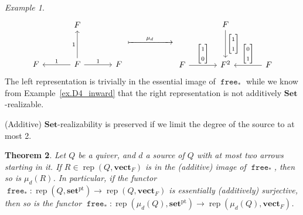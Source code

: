 \documentclass[a4paper]{amsart}
\theoremstyle{plain}
\newtheorem{theorem}{Theorem}[section]
\theoremstyle{definition}
\theoremstyle{remark}
\newtheorem{example}[theorem]{Example}
\newcommand{\funct}[1]{\operatorname{\mathtt{#1}}}
\newcommand{\Set}{\mathbf{Set}}
\newcommand{\pset}{\mathbf{set}^\mathrm{pt}}
\newcommand{\vectF}{\mathbf{vect}_F}
\DeclareMathOperator{\rep}{rep}
\begin{document}
\begin{example}
\[\begin{tikzcd}[column sep=12mm,row sep=12mm,ampersand replacement=\&] \& F \& \\ F \& F\ar[u, "1"]\ar[l,swap,"1"]\ar[r,"1"] \& F\end{tikzcd}\xmapsto{\qquad\mu_d\qquad} \begin{tikzcd}[column sep=12mm,row sep=12mm,ampersand replacement=\&] \& F\ar[d,"{\begin{bmatrix} 1 \\ 1\end{bmatrix}}"] \& \\F\ar[r,"{\begin{bmatrix} 1 \\ 0\end{bmatrix}}"]  \& F^2\& F\ar[l,swap,"{\begin{bmatrix} 0 \\ 1\end{bmatrix}}"]\end{tikzcd} \]
The left representation is trivially in the essential image of $\funct{free}_*$ while we know from Example~\ref{ex.D4_inward} that the right representation is not additively $\Set$-realizable.
\end{example}

(Additive) \( \Set \)-realizability is preserved if we limit the degree of the source to at most 2. 

\begin{theorem} \label{thm.APR_preserves_induced}
Let \( Q \) be a quiver, and \( d \) a source of \( Q \) with at most two arrows starting in it. If $R\in \rep(Q, \vectF)$ is in the (additive) image of $\funct{free}_*$, then so is $\mu_d(R)$. In particular, if the functor \( \funct{free}_* \colon \rep( Q, \pset) \to \rep( Q, \vectF ) \) is essentially (additively) surjective, then so is the functor \( \funct{free}_* \colon \rep( \mu_d(Q), \pset) \to \rep( \mu_d(Q), \vectF ) \).
\end{theorem}
\end{document}
